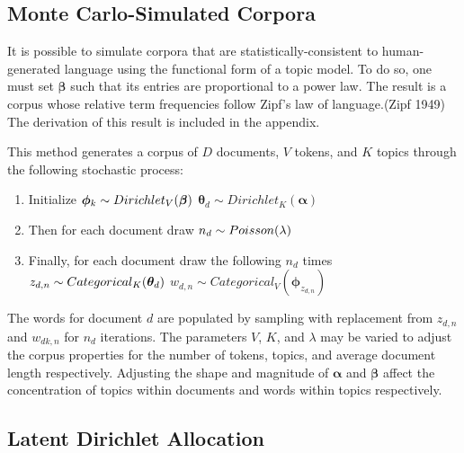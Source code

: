 \documentclass[conference,final,]{IEEEtran}
\providecommand{\tightlist}{%
  \setlength{\itemsep}{0pt}\setlength{\parskip}{0pt}}
\begin{document}
\hypertarget{monte-carlo-simulated-corpora}{%
\subsection{Monte Carlo-Simulated
Corpora}\label{monte-carlo-simulated-corpora}}

It is possible to simulate corpora that are statistically-consistent to
human-generated language using the functional form of a topic model. To
do so, one must set \(\boldsymbol\beta\) such that its entries are
proportional to a power law. The result is a corpus whose relative term
frequencies follow Zipf's law of language.(Zipf 1949) The derivation of
this result is included in the appendix.

This method generates a corpus of \(D\) documents, \(V\) tokens, and
\(K\) topics through the following stochastic process:

\begin{enumerate}
\def\labelenumi{\arabic{enumi}.}
\tightlist
\item
  Initialize
  \(\\ \boldsymbol\phi_k \sim Dirichlet_V(\boldsymbol\beta)\\\)
  \(\boldsymbol\theta_d \sim Dirichlet_K(\boldsymbol\alpha)\)
\item
  Then for each document draw \(\\ n_d \sim Poisson(\lambda)\)
\item
  Finally, for each document draw the following \(n_d\) times
  \(\\ z_{d,n} \sim Categorical_K(\boldsymbol\theta_d)\\\)
  \(w_{d,n} \sim Categorical_V(\boldsymbol\phi_{z_{d,n}})\)
\end{enumerate}

The words for document \(d\) are populated by sampling with replacement
from \(z_{d,n}\) and \(w_{dk,n}\) for \(n_d\) iterations. The parameters
\(V\), \(K\), and \(\lambda\) may be varied to adjust the corpus
properties for the number of tokens, topics, and average document length
respectively. Adjusting the shape and magnitude of \(\boldsymbol\alpha\)
and \(\boldsymbol\beta\) affect the concentration of topics within
documents and words within topics respectively.

\hypertarget{latent-dirichlet-allocation}{%
\subsection{Latent Dirichlet
Allocation}\label{latent-dirichlet-allocation}}
\end{document}
